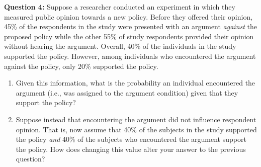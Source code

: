 \documentclass[10pt]{amsart}
\begin{document}
\pagebreak

\textbf{Question 4:}
Suppose a researcher conducted an experiment in which they measured public opinion towards a new policy. Before they offered their opinion, 45\% of the respondents in the study were presented with an argument \textit{against} the proposed policy while the other 55\% of study respondents provided their opinion without hearing the argument.  Overall, 40\% of the individuals in the study supported the policy. However, among individuals who encountered the argument against the policy, only 20\% supported the policy. 

\begin{enumerate}

\item Given this information, what is the probability an individual encountered the argument (i.e., was assigned to the argument condition) given that they support the policy?

\item Suppose instead that encountering the argument did not influence respondent opinion. That is, now assume that 40\% of the subjects in the study supported the policy \textit{and} 40\% of the subjects who encountered the argument support the policy. How does changing this value alter your answer to the previous question? 
\end{enumerate}

\bigskip
\end{document}
